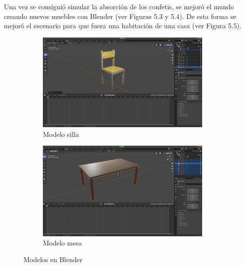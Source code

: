 Una vez se consiguió simular la absorción de los confetis, se mejoró el mundo creando nuevos muebles con Blender (ver Figuras 5.3 y 5.4). De esta forma se mejoró el escenario para que fuera una habitación de una casa (ver Figura 5.5).
\begin{figure}[H]
  \begin{subfigure}[b]{0.5\textwidth}
  \centering
    \includegraphics[width=0.95\textwidth, height=0.6\textwidth]{chapters/images/silla.png}
    \caption{Modelo silla}
    \label{fig:f1}
  \end{subfigure}
  \hfill
  \begin{subfigure}[b]{0.5\textwidth}
  \centering
    \includegraphics[width=0.95\textwidth, height=0.6\textwidth]{chapters/images/mesa.png}
	\caption{Modelo mesa}    
    \label{fig:f2}
 
  \end{subfigure}
  \caption{Modelos en Blender}
\end{figure}

